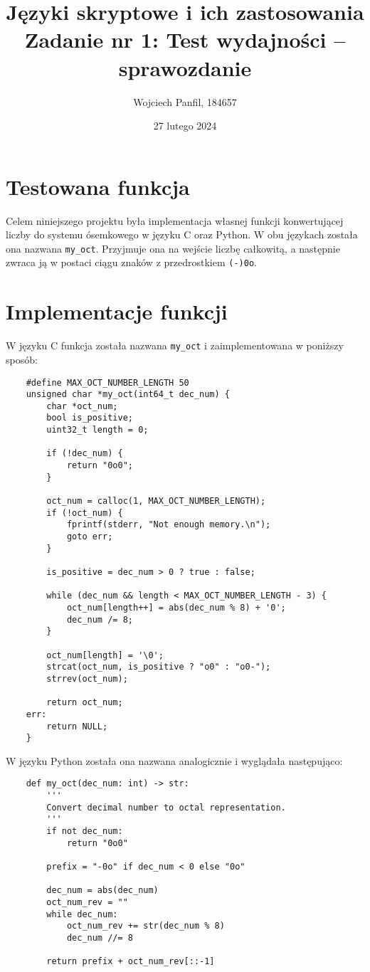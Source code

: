 \documentclass[11pt]{article}
\title{
	\textbf{Języki skryptowe i ich zastosowania}\\
	Zadanie nr 1: Test wydajności -- sprawozdanie}
\author{Wojciech Panfil, 184657}
\date{27 lutego 2024}
\begin{document}
	\maketitle
	
	\section{Testowana funkcja}
	Celem niniejszego projektu była implementacja własnej funkcji
	konwertującej liczby do systemu ósemkowego w języku C oraz Python.
	W obu językach została ona nazwana \texttt{my\_oct}.
	Przyjmuje ona na wejście liczbę całkowitą, a następnie zwraca ją w
	postaci ciągu znaków z przedrostkiem \texttt{(-)0o}.

	\section{Implementacje funkcji}
	W języku C funkcja została nazwana \texttt{my\_oct} i zaimplementowana w poniższy sposób:
	\begin{lstlisting}
	#define MAX_OCT_NUMBER_LENGTH 50
	unsigned char *my_oct(int64_t dec_num) {
		char *oct_num;
		bool is_positive;
		uint32_t length = 0;
		
		if (!dec_num) {
			return "0o0";
		}

		oct_num = calloc(1, MAX_OCT_NUMBER_LENGTH);
		if (!oct_num) {
			fprintf(stderr, "Not enough memory.\n");
			goto err;
		}

		is_positive = dec_num > 0 ? true : false;

		while (dec_num && length < MAX_OCT_NUMBER_LENGTH - 3) {
			oct_num[length++] = abs(dec_num % 8) + '0';
			dec_num /= 8;
		}

		oct_num[length] = '\0';
		strcat(oct_num, is_positive ? "o0" : "o0-");
		strrev(oct_num);

		return oct_num;
	err:
		return NULL;
	}
	\end{lstlisting}

	W języku Python została ona nazwana analogicznie i wyglądała następująco:

	\begin{lstlisting}
	def my_oct(dec_num: int) -> str:
		'''
		Convert decimal number to octal representation.
		'''
		if not dec_num:
			return "0o0"

		prefix = "-0o" if dec_num < 0 else "0o"

		dec_num = abs(dec_num)
		oct_num_rev = ""
		while dec_num:
			oct_num_rev += str(dec_num % 8)
			dec_num //= 8

		return prefix + oct_num_rev[::-1]
	\end{lstlisting}
	
\end{document}
